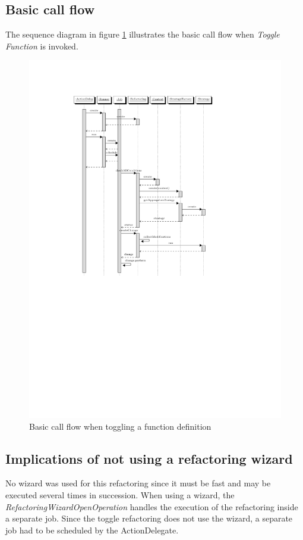 \subsection{Basic call flow}
The sequence diagram in figure \ref{sd} illustrates the basic call flow when 
\textit{Toggle Function} is invoked.
\begin{figure}[h]
  \centering
  \includegraphics[trim = 35mm 120mm 40mm
28mm,clip,scale=0.8]{seqdiagram/seqdiagram.pdf} %
  \caption{Basic call flow when toggling a function definition}
  \label{sd}
\end{figure}

\subsection{Implications of not using a refactoring wizard}
No wizard was used for this refactoring since it must be fast and may be 
executed several times in succession. When using a wizard, the 
\textit{RefactoringWizardOpenOperation} handles the execution of the refactoring 
inside a separate job. Since the toggle refactoring does not use the wizard, a 
separate job had to be scheduled by the ActionDelegate.

